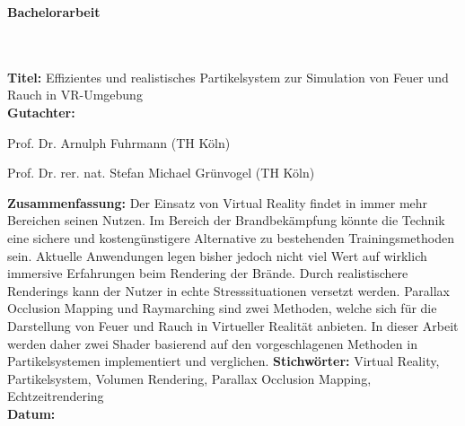 \addtocounter{page}{1}

\begin{flushleft}
    \begin{huge}
        \textbf{Bachelorarbeit}
    \end{huge}
    ~\\
    ~\\
    \textbf{Titel:}  Effizientes und realistisches Partikelsystem zur Simulation von Feuer und Rauch in VR-Umgebung
    ~\\
    \doublespacing
    \textbf{Gutachter:}
    \begin{description}
        \vspace{-0.2cm}
        \itemsep-8pt
        \item[–]
            Prof. Dr. Arnulph Fuhrmann (TH Köln)
        \item[–]
            Prof. Dr. rer. nat. Stefan Michael Grünvogel (TH Köln)
    \end{description}
    \vspace{-0.5cm}
    \singlespacing
    \textbf{Zusammenfassung:} Der Einsatz von Virtual Reality findet in immer mehr Bereichen 
    seinen Nutzen. Im Bereich der Brandbekämpfung könnte die Technik eine sichere und 
    kostengünstigere Alternative zu bestehenden Trainingsmethoden sein. 
    Aktuelle Anwendungen legen bisher jedoch nicht viel Wert auf wirklich immersive Erfahrungen 
    beim Rendering der Brände. Durch realistischere Renderings kann der Nutzer in echte Stresssituationen
    versetzt werden. Parallax Occlusion Mapping und Raymarching sind zwei Methoden, welche sich für die 
    Darstellung von Feuer und Rauch in Virtueller Realität anbieten.
    In dieser Arbeit werden daher zwei Shader basierend auf den vorgeschlagenen Methoden in 
    Partikelsystemen implementiert und verglichen. \singlespacing
    \textbf{Stichwörter:} Virtual Reality, Partikelsystem, Volumen Rendering, Parallax Occlusion Mapping, Echtzeitrendering\\
    \doublespacing
    \textbf{Datum:}


    \vspace{1.5cm}


\end{flushleft}
